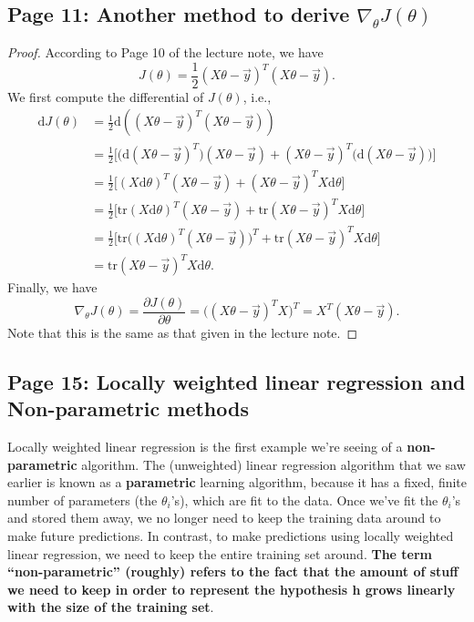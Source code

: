 \documentclass{article}
\begin{document}
\subsection{Page 11: Another method to derive $\nabla_{\theta}J(\theta)$}
\begin{proof}
According to Page 10 of the lecture note, we have
\[
J(\theta)=\frac{1}{2}(X\theta-\vec{y})^T(X\theta-\vec{y}).
\]
We first compute the differential of $J(\theta)$, i.e.,
\[
\begin{split}
\text{d}J(\theta)
&=\frac{1}{2}\text{d}\left((X\theta-\vec{y})^T(X\theta-\vec{y})\right)\\
&=\frac{1}{2}\big[\big(\text{d}(X\theta-\vec{y})^T\big)(X\theta-\vec{y})+(X\theta-\vec{y})^T\big(\text{d}(X\theta-\vec{y})\big)\big]\\
&=\frac{1}{2}\big[(X\text{d}\theta)^T(X\theta-\vec{y})+(X\theta-\vec{y})^TX\text{d}\theta\big]\\
&=\frac{1}{2}\big[\text{tr}(X\text{d}\theta)^T(X\theta-\vec{y})+\text{tr}(X\theta-\vec{y})^TX\text{d}\theta\big]\\
&=\frac{1}{2}\big[\text{tr}\big((X\text{d}\theta)^T(X\theta-\vec{y})\big)^T+\text{tr}(X\theta-\vec{y})^TX\text{d}\theta\big]\\
&=\text{tr}(X\theta-\vec{y})^TX\text{d}\theta.
\end{split}
\]
Finally, we have
\[
\nabla_{\theta}J(\theta)=\frac{\partial{J(\theta)}}{\partial{\theta}}=\big((X\theta-\vec{y})^TX\big)^T=X^T(X\theta-\vec{y}).
\]
Note that this is the same as that given in the lecture note.
\end{proof}

\subsection{Page 15: Locally weighted linear regression and Non-parametric methods}
Locally weighted linear regression is the first example we're seeing of a \textbf{non-parametric} algorithm. The (unweighted) linear regression algorithm that we saw earlier is known as a \textbf{parametric} learning algorithm, because it has a fixed, finite number of parameters (the $\theta_i$'s), which are fit to the data. Once we've fit the $\theta_i$'s and stored them away, we no longer need to keep the training data around to make future predictions. In contrast, to make predictions using locally weighted linear regression, we need to keep the entire training set around. \textbf{The term ``non-parametric'' (roughly) refers to the fact that the amount of stuff we need to keep in order to represent the hypothesis h grows linearly with the size of the training set}.
\end{document}
